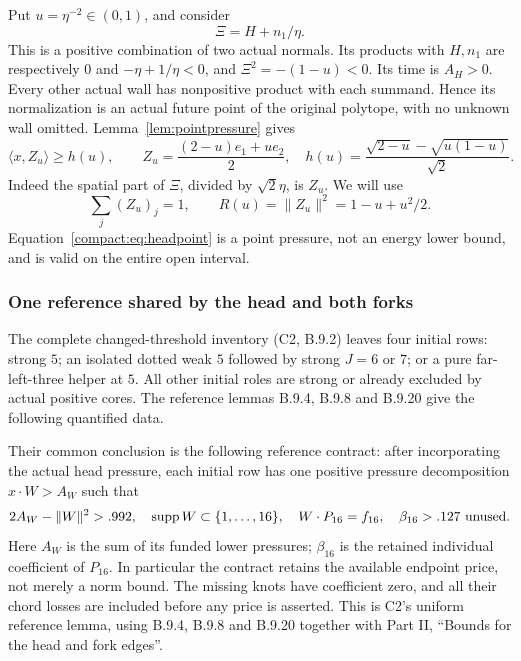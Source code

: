 \documentclass[11pt]{article}
\theoremstyle{remark}\newtheorem{remark}[theorem]{Remark}
\numberwithin{equation}{section}
\newcommand{\ip}[2]{\langle #1,#2\rangle}
\newcommand{\norm}[1]{\lVert #1\rVert}
\begin{document}
Put \(u=\eta^{-2}\in(0,1)\), and consider
 \[
 \Xi=H+n_1/\eta.
\]
This is a positive combination of two actual normals.
Its products with \(H,n_1\) are respectively \(0\) and
 \(-\eta+1/\eta<0\), and \(\Xi^2=-(1-u)<0\).
Its time is \(A_H>0\). Every other actual wall has nonpositive
product with each summand. Hence its normalization is an actual
future point of the original polytope, with no unknown wall
omitted. Lemma~\ref{lem:pointpressure} gives
 \begin{equation}
\label{compact:eq:headpoint}
 \ip{x}{Z_u}\geq h(u),\qquad
 Z_u=\frac{(2-u)e_1+u e_2}{2},\quad
 h(u)=\frac{\sqrt{2-u}-\sqrt{u(1-u)}}{\sqrt2}.
\end{equation}
Indeed the spatial part of \(\Xi\), divided by \(\sqrt2\eta\),
is \(Z_u\). We will use
 \[
 \sum_j(Z_u)_j=1,\qquad R(u)=\norm{Z_u}^2=1-u+u^2/2.
\]
Equation~\eqref{compact:eq:headpoint} is a point pressure, not an
energy lower bound, and is valid on the entire open interval.


\subsubsection{One reference shared by the head and both forks}
The complete changed-threshold inventory (C2, B.9.2) leaves four initial
rows: strong $5$; an isolated dotted weak $5$ followed by strong $J=6$
or $7$; or a pure far-left-three helper at $5$. All other initial roles
are strong or already excluded by actual positive cores. The reference
lemmas B.9.4, B.9.8 and B.9.20 give the following quantified data.

Their common conclusion is the following reference contract: after
incorporating the actual head pressure, each initial row has one positive
pressure decomposition $x\cdot W>A_W$ such that
\begin{equation}\label{compact:eq:uniformcontract}
 2A_W-\norm W^2>.992,\quad
 \operatorname{supp}W\subset\{1,\ldots,16\},\quad
 W\cdot P_{16}=f_{16},\quad \beta_{16}>.127\ \hbox{unused}.
\end{equation}
Here $A_W$ is the sum of its funded lower pressures; $\beta_{16}$ is the
retained individual coefficient of $P_{16}$. In particular the contract
retains the available endpoint price, not merely a norm bound. The
missing knots have coefficient zero, and all their chord losses are
included before any price is asserted. This is C2's uniform reference
lemma, using B.9.4, B.9.8 and B.9.20 together with Part II,
``Bounds for the head and fork edges''.
\end{document}
